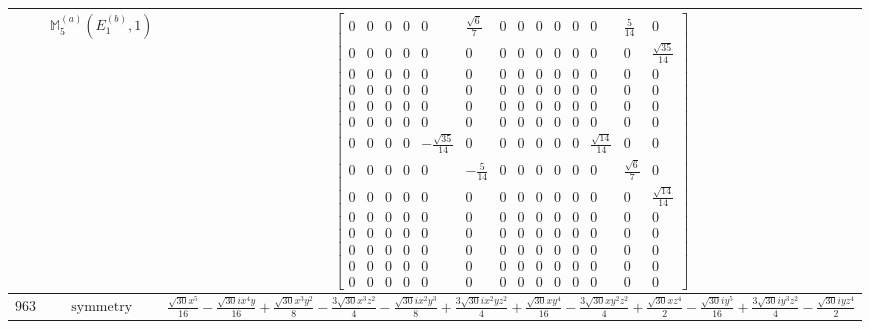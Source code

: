 \documentclass[fleqn,8pt,landscape]{jsarticle}
\begin{document}
\begin{longtable}{ccc}
$  $ & $ \mathbb{M}_{5}^{(a)}(E_{1}^{(b)},1) $ & $ \begin{bmatrix} 0 & 0 & 0 & 0 & 0 & \frac{\sqrt{6}}{7} & 0 & 0 & 0 & 0 & 0 & 0 & \frac{5}{14} & 0 \\ 0 & 0 & 0 & 0 & 0 & 0 & 0 & 0 & 0 & 0 & 0 & 0 & 0 & \frac{\sqrt{35}}{14} \\ 0 & 0 & 0 & 0 & 0 & 0 & 0 & 0 & 0 & 0 & 0 & 0 & 0 & 0 \\ 0 & 0 & 0 & 0 & 0 & 0 & 0 & 0 & 0 & 0 & 0 & 0 & 0 & 0 \\ 0 & 0 & 0 & 0 & 0 & 0 & 0 & 0 & 0 & 0 & 0 & 0 & 0 & 0 \\ 0 & 0 & 0 & 0 & 0 & 0 & 0 & 0 & 0 & 0 & 0 & 0 & 0 & 0 \\ 0 & 0 & 0 & 0 & - \frac{\sqrt{35}}{14} & 0 & 0 & 0 & 0 & 0 & 0 & \frac{\sqrt{14}}{14} & 0 & 0 \\ 0 & 0 & 0 & 0 & 0 & - \frac{5}{14} & 0 & 0 & 0 & 0 & 0 & 0 & \frac{\sqrt{6}}{7} & 0 \\ 0 & 0 & 0 & 0 & 0 & 0 & 0 & 0 & 0 & 0 & 0 & 0 & 0 & \frac{\sqrt{14}}{14} \\ 0 & 0 & 0 & 0 & 0 & 0 & 0 & 0 & 0 & 0 & 0 & 0 & 0 & 0 \\ 0 & 0 & 0 & 0 & 0 & 0 & 0 & 0 & 0 & 0 & 0 & 0 & 0 & 0 \\ 0 & 0 & 0 & 0 & 0 & 0 & 0 & 0 & 0 & 0 & 0 & 0 & 0 & 0 \\ 0 & 0 & 0 & 0 & 0 & 0 & 0 & 0 & 0 & 0 & 0 & 0 & 0 & 0 \\ 0 & 0 & 0 & 0 & 0 & 0 & 0 & 0 & 0 & 0 & 0 & 0 & 0 & 0 \end{bmatrix} $ \\ \hline
$ 963 $ & $ \text{symmetry} $ & $ \frac{\sqrt{30} x^{5}}{16} - \frac{\sqrt{30} i x^{4} y}{16} + \frac{\sqrt{30} x^{3} y^{2}}{8} - \frac{3 \sqrt{30} x^{3} z^{2}}{4} - \frac{\sqrt{30} i x^{2} y^{3}}{8} + \frac{3 \sqrt{30} i x^{2} y z^{2}}{4} + \frac{\sqrt{30} x y^{4}}{16} - \frac{3 \sqrt{30} x y^{2} z^{2}}{4} + \frac{\sqrt{30} x z^{4}}{2} - \frac{\sqrt{30} i y^{5}}{16} + \frac{3 \sqrt{30} i y^{3} z^{2}}{4} - \frac{\sqrt{30} i y z^{4}}{2} $ \\

\end{longtable}
\end{document}
